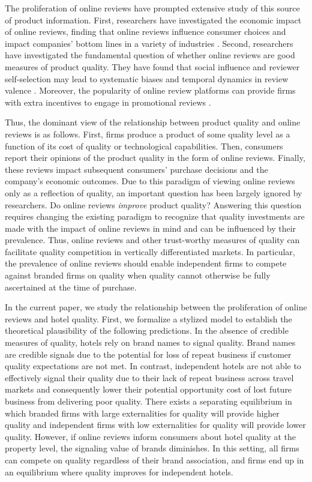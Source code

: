 \documentclass[mksc,blindrev]{informs3} %
\begin{document}
The proliferation of online reviews have prompted extensive study of this source of product information. First, researchers have investigated the economic impact of online reviews, finding that online reviews influence consumer choices and impact companies' bottom lines in a variety of industries \citep{chevalier2006effect,zhu2010impact,ye2009impact}. Second, researchers have investigated the fundamental question of whether online reviews are good measures of product quality. They have found that social influence and reviewer self-selection may lead to systematic biases and temporal dynamics in review valence \citep{hu2006can, moe2012online, godes2012sequential}. Moreover, the popularity of online review platforms can provide firms with extra incentives to engage in promotional reviews \citep{mayzlin2014promotional}. 

Thus, the dominant view of the relationship between product quality and online reviews  is as follows. First, firms produce a product of some quality level as a function of its cost of quality or technological capabilities. Then, consumers report their opinions of the product quality in the form of online reviews. Finally, these reviews impact subsequent consumers' purchase decisions and the company's economic outcomes. Due to this paradigm of viewing online reviews only as a reflection of quality, an important question has been largely ignored by researchers. Do online reviews \textit{improve} product quality? Answering this question requires changing the existing paradigm to recognize that quality investments are made with the impact of online reviews in mind and can be influenced by their prevalence. Thus, online reviews and other trust-worthy measures of quality can facilitate quality competition in vertically differentiated markets. In particular, the prevalence of online reviews should enable independent firms to compete against branded firms on quality when quality cannot otherwise be fully ascertained at the time of purchase.

In the current paper, we study the relationship between the proliferation of online reviews and hotel quality. First, we formalize a stylized model to establish the theoretical plausibility of the following predictions. In the absence of credible measures of quality, hotels rely on brand names to signal quality. Brand names are credible signals due to the potential for loss of repeat business if customer quality expectations are not met. In contrast, independent hotels are not able to effectively signal their quality due to their lack of repeat business across travel markets and consequently lower their potential opportunity cost of lost future business from delivering poor quality. There exists a separating equilibrium in which branded firms with large externalities for quality will provide higher quality and independent firms with low externalities for quality will provide lower quality. However, if online reviews inform consumers about hotel quality at the property level, the signaling value of brands diminishes. In this setting, all firms can compete on quality regardless of their brand association, and firms end up in an equilibrium where quality improves for independent hotels. 
\end{document}
